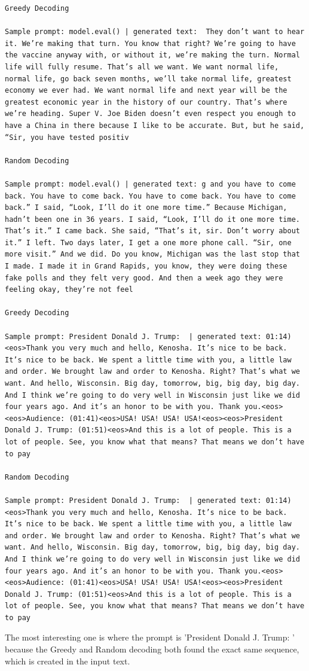 \documentclass{article}
\begin{document}
\begin{lstlisting}
Greedy Decoding

Sample prompt: model.eval() | generated text:  They don’t want to hear it. We’re making that turn. You know that right? We’re going to have the vaccine anyway with, or without it, we’re making the turn. Normal life will fully resume. That’s all we want. We want normal life, normal life, go back seven months, we’ll take normal life, greatest economy we ever had. We want normal life and next year will be the greatest economic year in the history of our country. That’s where we’re heading. Super V. Joe Biden doesn’t even respect you enough to have a China in there because I like to be accurate. But, but he said, “Sir, you have tested positiv

Random Decoding

Sample prompt: model.eval() | generated text: g and you have to come back. You have to come back. You have to come back. You have to come back.” I said, “Look, I’ll do it one more time.” Because Michigan, hadn’t been one in 36 years. I said, “Look, I’ll do it one more time. That’s it.” I came back. She said, “That’s it, sir. Don’t worry about it.” I left. Two days later, I get a one more phone call. “Sir, one more visit.” And we did. Do you know, Michigan was the last stop that I made. I made it in Grand Rapids, you know, they were doing these fake polls and they felt very good. And then a week ago they were feeling okay, they’re not feel

Greedy Decoding

Sample prompt: President Donald J. Trump:  | generated text: 01:14)<eos>Thank you very much and hello, Kenosha. It’s nice to be back. It’s nice to be back. We spent a little time with you, a little law and order. We brought law and order to Kenosha. Right? That’s what we want. And hello, Wisconsin. Big day, tomorrow, big, big day, big day. And I think we’re going to do very well in Wisconsin just like we did four years ago. And it’s an honor to be with you. Thank you.<eos><eos>Audience: (01:41)<eos>USA! USA! USA! USA!<eos><eos>President Donald J. Trump: (01:51)<eos>And this is a lot of people. This is a lot of people. See, you know what that means? That means we don’t have to pay 

Random Decoding

Sample prompt: President Donald J. Trump:  | generated text: 01:14)<eos>Thank you very much and hello, Kenosha. It’s nice to be back. It’s nice to be back. We spent a little time with you, a little law and order. We brought law and order to Kenosha. Right? That’s what we want. And hello, Wisconsin. Big day, tomorrow, big, big day, big day. And I think we’re going to do very well in Wisconsin just like we did four years ago. And it’s an honor to be with you. Thank you.<eos><eos>Audience: (01:41)<eos>USA! USA! USA! USA!<eos><eos>President Donald J. Trump: (01:51)<eos>And this is a lot of people. This is a lot of people. See, you know what that means? That means we don’t have to pay 

\end{lstlisting}
The most interesting one is where the prompt is 'President Donald J. Trump: ' because the Greedy and Random decoding both found the exact same sequence, which is created in the input text.
\clearpage
\end{document}
